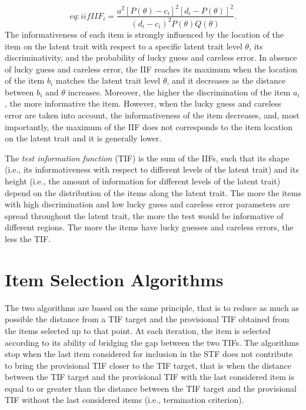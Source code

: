 \documentclass{svproc}
\begin{document}
\begin{equation}{eq:iif}
	IIF_i = \dfrac{a^2[P(\theta)-c_i]^2[d_i - P(\theta)]^2}{(d_i-c_i)^2 P(\theta)Q(\theta)}.
\end{equation}
The informativeness of each item is strongly influenced by the location of the item on the latent trait with respect to a specific latent trait level $\theta$, its discriminativity, and the probability of lucky guess and careless error. In absence of lucky guess and careless error, the IIF reaches its maximum when the location of the item $b_i$ matches the latent trait level $\theta$, and it decreases as the distance between $b_i$ and $\theta$ increases. Moreover, the higher the discrimination of the item $a_i$, the more informative the item. However, when the lucky guess and careless error are taken into account, the informativeness of the item decreases, and, most importantly, the maximum of the IIF does not corresponds to the item location on the latent trait and it is generally lower. 

The \emph{test information function} (TIF) is the sum of the IIFs, such that its shape (i.e., its informativeness with respect to different levels of the latent trait) and its height (i.e., the amount of information for different levels of the latent trait) depend on the distribution of the items along the latent trait. The more the items with high discrimination and low lucky guess and careless error parameters are spread throughout the latent trait, the more the test would be informative of different regions. The more the items have lucky guesses and careless errors, the less the TIF. 

\section{Item Selection Algorithms}

The two algorithms are based on the same principle, that is to reduce as much as possible the distance from a TIF target and the provisional TIF obtained from the items selected up to that point. 
At each iteration, the item is selected according to its ability of bridging the gap between the two TIFs. The algorithms stop when the last item considered for inclusion in the STF does not contribute to bring the provisional TIF closer to the TIF target, that is when the distance between the TIF target and the provisional TIF with the last considered item is equal to or greater than the distance between the TIF target and the provisional TIF without the last considered items (i.e., termination criterion). 
\end{document}
